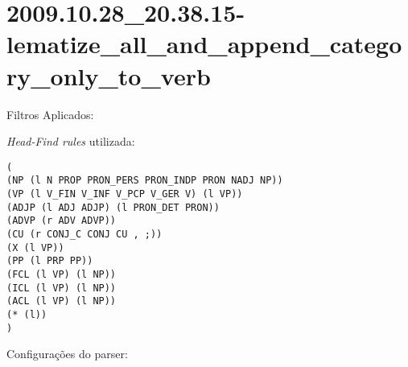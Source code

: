 \section{2009.10.28_20.38.15-lematize_all_and_append_category_only_to_verb} %
\label{sec:exp:2009.10.28_20.38.15-lematize_all_and_append_category_only_to_verb}

Filtros Aplicados:

\begin{itemize}
  
  \item{\emph{LematizeAllAndAppendCategoryOnlyToVerb}
  
\end{itemize}

\emph{Head-Find rules} utilizada:

\scriptsize
\begin{verbatim}
(
(NP (l N PROP PRON_PERS PRON_INDP PRON NADJ NP))
(VP (l V_FIN V_INF V_PCP V_GER V) (l VP))
(ADJP (l ADJ ADJP) (l PRON_DET PRON))
(ADVP (r ADV ADVP))
(CU (r CONJ_C CONJ CU , ;))
(X (l VP))
(PP (l PRP PP))
(FCL (l VP) (l NP))
(ICL (l VP) (l NP))
(ACL (l VP) (l NP))
(* (l))
)

\end{verbatim}

\normalsize

Configurações do parser:

